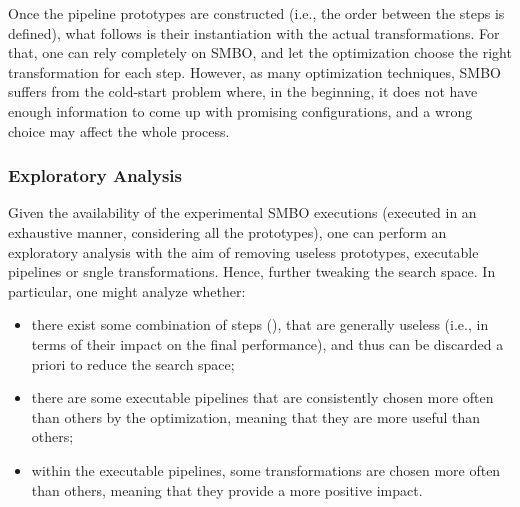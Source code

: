 Once the pipeline prototypes are constructed (i.e., the order between the steps is defined), what follows is their instantiation with the actual transformations.
For that, one can rely completely on SMBO, and let the optimization choose the right transformation for each step.
However, as many optimization techniques, SMBO suffers from the cold-start problem where, in the beginning, it does not have enough information to come up with promising configurations, and a wrong choice may affect the whole process.

\subsubsection{Exploratory Analysis}
Given the availability of the experimental SMBO executions (executed in an exhaustive manner, considering all the prototypes), one can perform an exploratory analysis with the aim of removing useless prototypes, executable pipelines or sngle transformations.
Hence, further tweaking the search space.
In particular, one might analyze whether:

\begin{itemize}
    \item there exist some combination of steps (), that are generally useless (i.e., in terms of their impact on the final performance), and thus can be discarded a priori to reduce the search space;
    \item there are some executable pipelines that are consistently chosen more often than others by the optimization, meaning that they are more useful than others;
    \item within the executable pipelines, some transformations are chosen more often than others, meaning that they provide a more positive impact.
    \end{itemize}

